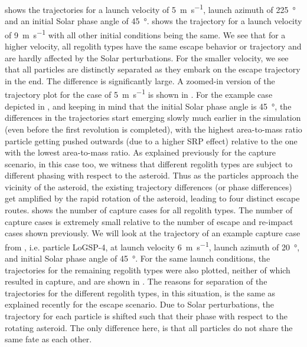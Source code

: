  shows the trajectories for a launch velocity of \SI{5}{\metre\per\second}, launch azimuth of \SI{225}{\degree} and an initial Solar phase angle of \SI{45}{\degree}.  shows the trajectory for a launch velocity of \SI{9}{\metre\per\second} with all other initial conditions being the same. We see that for a higher velocity, all regolith types have the same escape behavior or trajectory and are hardly affected by the Solar perturbations. For the smaller velocity, we see that all particles are distinctly separated as they embark on the escape trajectory in the end. The difference is significantly large. A zoomed-in version of the trajectory plot for the case of \SI{5}{\metre\per\second} is shown in . For the example case depicted in , and keeping in mind that the initial Solar phase angle is \SI{45}{\degree}, the differences in the trajectories start emerging slowly much earlier in the simulation (even before the first revolution is completed), with the highest area-to-mass ratio particle getting pushed outwards (due to a higher \gls{SRP} effect) relative to the one with the lowest area-to-mass ratio. As explained previously for the capture scenario, in this case too, we witness that different regolith types are subject to different phasing with respect to the asteroid. Thus as the particles approach the vicinity of the asteroid, the existing trajectory differences (or phase differences) get amplified by the rapid rotation of the asteroid, leading to four distinct escape routes.
%
\newline\newline
%
 shows the number of capture cases for all regolith types. The number of capture cases is extremely small relative to the number of escape and re-impact cases shown previously. We will look at the trajectory of an example capture case from , i.e. particle LoGSP-4, at launch velocity \SI{6}{\metre\per\second}, launch azimuth of \SI{20}{\degree}, and initial Solar phase angle of \SI{45}{\degree}. For the same launch conditions, the trajectories for the remaining regolith types were also plotted, neither of which resulted in capture, and are shown in . The reasons for separation of the trajectories for the different regolith types, in this situation, is the same as explained recently for the escape scenario. Due to Solar perturbations, the trajectory for each particle is shifted such that their phase with respect to the rotating asteroid. The only difference here, is that all particles do not share the same fate as each other.

